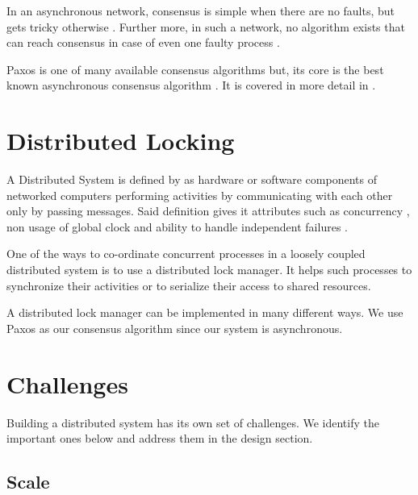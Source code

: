 In an asynchronous network, consensus is simple when there are no faults, but
gets tricky otherwise \citep{Lampson:1996:HBH}. Further more, in such a network,
no algorithm exists that can reach consensus in case of even one faulty process
\citep{FisLynPat85}.

Paxos is one of many available consensus algorithms but, its core is the best
known asynchronous consensus algorithm \citep{Lampson:1996:HBH}. It is covered
in more detail in .

\section{Distributed Locking}

A Distributed System is defined by \citet[]{coulouris2005distributed} as
hardware or software components of networked computers performing activities by
communicating with each other only by passing messages. Said definition gives
it attributes such as concurrency%
, non usage of global clock%
and ability to handle independent failures
.

One of the ways to co-ordinate concurrent processes in a loosely coupled
distributed system is to use a distributed lock manager. It helps such
processes to synchronize their activities or to serialize their access to
shared resources.

A distributed lock manager can be implemented in many different ways. We use
Paxos as our consensus algorithm since our system is asynchronous.

\section{Challenges}

Building a distributed system has its own set of challenges. We identify the
important ones below and address them in the design section.

\subsection{Scale}


